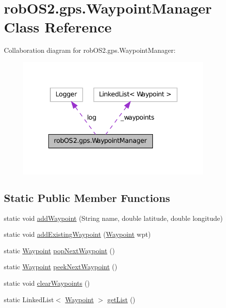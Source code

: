 \hypertarget{classrob_o_s2_1_1gps_1_1_waypoint_manager}{
\section{robOS2.gps.WaypointManager Class Reference}
\label{classrob_o_s2_1_1gps_1_1_waypoint_manager}
}


Collaboration diagram for robOS2.gps.WaypointManager:\nopagebreak
\begin{figure}[H]
\begin{center}
\leavevmode
\includegraphics[width=278pt]{classrob_o_s2_1_1gps_1_1_waypoint_manager__coll__graph}
\end{center}
\end{figure}
\subsection*{Static Public Member Functions}
\begin{DoxyCompactItemize}
\item 
static void \hyperlink{classrob_o_s2_1_1gps_1_1_waypoint_manager_a37328421433740b4ab0474c80b97d91d}{addWaypoint} (String name, double latitude, double longitude)
\item 
static void \hyperlink{classrob_o_s2_1_1gps_1_1_waypoint_manager_abfc1d1d22e446474e365cfdb13f9d2dc}{addExistingWaypoint} (\hyperlink{classrob_o_s2_1_1gps_1_1_waypoint}{Waypoint} wpt)
\item 
static \hyperlink{classrob_o_s2_1_1gps_1_1_waypoint}{Waypoint} \hyperlink{classrob_o_s2_1_1gps_1_1_waypoint_manager_a1038572b3c993a8d3191efafbc3ae31a}{popNextWaypoint} ()
\item 
static \hyperlink{classrob_o_s2_1_1gps_1_1_waypoint}{Waypoint} \hyperlink{classrob_o_s2_1_1gps_1_1_waypoint_manager_a299c03fec3596735666da302198516a8}{peekNextWaypoint} ()
\item 
static void \hyperlink{classrob_o_s2_1_1gps_1_1_waypoint_manager_a8185bac57710dbaafc77b6d7916c1591}{clearWaypoints} ()
\item 
static LinkedList$<$ \hyperlink{classrob_o_s2_1_1gps_1_1_waypoint}{Waypoint} $>$ \hyperlink{classrob_o_s2_1_1gps_1_1_waypoint_manager_ab25908fbf87694d59e6b0a5a2ebe802f}{getList} ()
\end{DoxyCompactItemize}
